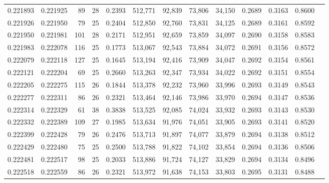 \begin{tabular}{rrrrrrrrrrrrr}
0.221893 & 0.221925 &  89 &  28 &                                     0.2393 & 512,771 &  92,839 &  73,806 &  34,150 & 0.2689 & 0.3163 & 0.8600 \\
0.221926 & 0.221950 &  79 &  25 &                                     0.2404 & 512,850 &  92,760 &  73,831 &  34,125 & 0.2689 & 0.3161 & 0.8592 \\
0.221950 & 0.221981 & 101 &  28 &                                     0.2171 & 512,951 &  92,659 &  73,859 &  34,097 & 0.2690 & 0.3158 & 0.8583 \\
0.221983 & 0.222078 & 116 &  25 &                                     0.1773 & 513,067 &  92,543 &  73,884 &  34,072 & 0.2691 & 0.3156 & 0.8572 \\
0.222079 & 0.222118 & 127 &  25 &                                     0.1645 & 513,194 &  92,416 &  73,909 &  34,047 & 0.2692 & 0.3154 & 0.8561 \\
0.222121 & 0.222204 &  69 &  25 &                                     0.2660 & 513,263 &  92,347 &  73,934 &  34,022 & 0.2692 & 0.3151 & 0.8554 \\
0.222205 & 0.222275 & 115 &  26 &                                     0.1844 & 513,378 &  92,232 &  73,960 &  33,996 & 0.2693 & 0.3149 & 0.8543 \\
0.222277 & 0.222311 &  86 &  26 &                                     0.2321 & 513,464 &  92,146 &  73,986 &  33,970 & 0.2694 & 0.3147 & 0.8536 \\
0.222314 & 0.222329 &  61 &  38 &                                     0.3838 & 513,525 &  92,085 &  74,024 &  33,932 & 0.2693 & 0.3143 & 0.8530 \\
0.222332 & 0.222389 & 109 &  27 &                                     0.1985 & 513,634 &  91,976 &  74,051 &  33,905 & 0.2693 & 0.3141 & 0.8520 \\
0.222399 & 0.222428 &  79 &  26 &                                     0.2476 & 513,713 &  91,897 &  74,077 &  33,879 & 0.2694 & 0.3138 & 0.8512 \\
0.222429 & 0.222480 &  75 &  25 &                                     0.2500 & 513,788 &  91,822 &  74,102 &  33,854 & 0.2694 & 0.3136 & 0.8506 \\
0.222481 & 0.222517 &  98 &  25 &                                     0.2033 & 513,886 &  91,724 &  74,127 &  33,829 & 0.2694 & 0.3134 & 0.8496 \\
0.222518 & 0.222559 &  86 &  26 &                                     0.2321 & 513,972 &  91,638 &  74,153 &  33,803 & 0.2695 & 0.3131 & 0.8488 \\

\end{tabular}
